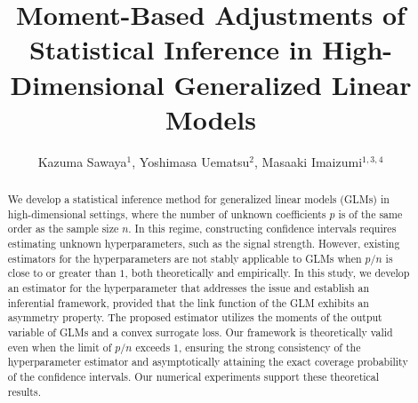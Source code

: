 \documentclass[12pt,reqno]{amsart}
\begin{document}
\title{{\Large Moment-Based Adjustments of Statistical Inference in High-Dimensional Generalized Linear Models}}



\date{}

\allowdisplaybreaks
\sloppy
\raggedbottom

\let\origmaketitle\maketitle
\def\maketitle{
  \begingroup
  \def\uppercasenonmath##1{} %
  \let\MakeUppercase\relax %
  \origmaketitle
  \endgroup
}

\author{Kazuma Sawaya$^1$, Yoshimasa Uematsu$^2$, Masaaki Imaizumi$^{1,3,4}$
}
\address{
$^1$The University of Tokyo, Tokyo, Japan \\
$^2$Hitotsubashi University, Tokyo, Japan\\
$^3$RIKEN Advanced Intelligene Project, Tokyo, Japan\\
$^4$Kyoto University, Kyoto, Japan
}


\begin{abstract}
We develop a statistical inference method for generalized linear models (GLMs) in high-dimensional settings, where the number of unknown coefficients $p$ is of the same order as the sample size $n$. In this regime, constructing confidence intervals requires estimating unknown hyperparameters, such as the signal strength. However, existing estimators for the hyperparameters are not stably applicable to GLMs when $p/n$ is close to or greater than $1$, both theoretically and empirically. In this study, we develop an estimator for the hyperparameter that addresses the issue and establish an inferential framework, provided that the link function of the GLM exhibits an asymmetry property. The proposed estimator utilizes the moments of the output variable of GLMs and a convex surrogate loss. Our framework is theoretically valid even when the limit of $p/n$ exceeds $1$, ensuring the strong consistency of the hyperparameter estimator and asymptotically attaining the exact coverage probability of the confidence intervals. Our numerical experiments support these theoretical results. 
\end{abstract}


\maketitle
\end{document}
